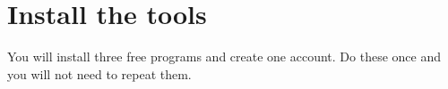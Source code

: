 \chapter{Install the tools}
\label{ch:install}

You will install three free programs and create one account. Do these once and you will not need to repeat them.


